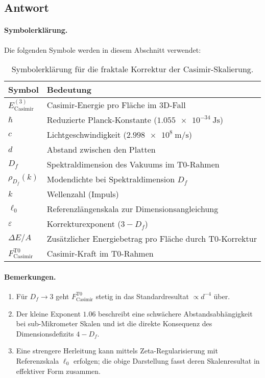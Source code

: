 \documentclass[12pt,a4paper]{article}
\theoremstyle{remark}
\newenvironment{answer}{\subsection*{Antwort}}{\vspace{1em}}
\begin{document}
\begin{answer}
	\paragraph{Symbolerklärung.}
	Die folgenden Symbole werden in diesem Abschnitt verwendet:
	\begin{table}[h]
		\centering
		\begin{tabular}{ll}
			\toprule
			\textbf{Symbol} & \textbf{Bedeutung} \\
			\midrule
			\( E_{\text{Casimir}}^{(3)} \) & Casimir-Energie pro Fläche im 3D-Fall \\
			\( \hbar \) & Reduzierte Planck-Konstante (\(\SI{1.055e-34}{\joule \second}\)) \\
			\( c \) & Lichtgeschwindigkeit (\(\SI{2.998e8}{\meter \per \second}\)) \\
			\( d \) & Abstand zwischen den Platten \\
			\( D_f \) & Spektraldimension des Vakuums im T0-Rahmen \\
			\( \rho_{D_f}(k) \) & Modendichte bei Spektraldimension \( D_f \) \\
			\( k \) & Wellenzahl (Impuls) \\
			\( \ell_0 \) & Referenzlängenskala zur Dimensionsangleichung \\
			\( \varepsilon \) & Korrekturexponent (\( 3 - D_f \)) \\
			\( \Delta E / A \) & Zusätzlicher Energiebetrag pro Fläche durch T0-Korrektur \\
			\( F_{\text{Casimir}}^{\text{T0}} \) & Casimir-Kraft im T0-Rahmen \\
			\bottomrule
		\end{tabular}
		\caption{Symbolerklärung für die fraktale Korrektur der Casimir-Skalierung.}
	\end{table}
	
	\paragraph{Bemerkungen.}
	\begin{enumerate}
		\item Für \( D_f \to 3 \) geht \( F_{\text{Casimir}}^{\text{T0}} \) stetig in das Standardresultat \( \propto d^{-4} \) über.
		\item Der kleine Exponent \( 1.06 \) beschreibt eine schwächere Abstandsabhängigkeit bei sub-Mikrometer Skalen und ist die direkte Konsequenz des Dimensionsdefizits \( 4 - D_f \).
		\item Eine strengere Herleitung kann mittels Zeta-Regularisierung mit Referenzskala \( \ell_0 \) erfolgen; die obige Darstellung fasst deren Skalenresultat in effektiver Form zusammen.
	\end{enumerate}		
	

\end{answer}
\end{document}
